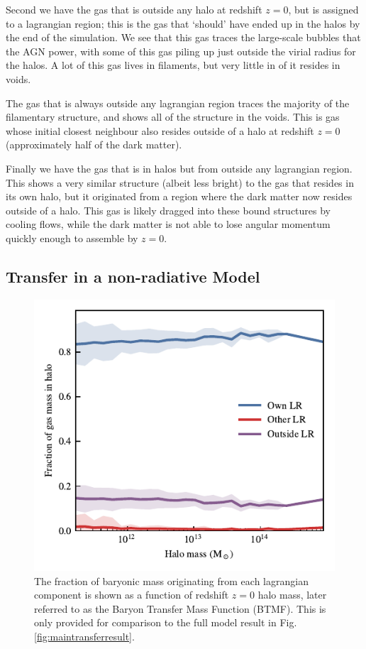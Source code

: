 Second we have the gas that is outside any halo at redshift $z=0$, but is assigned
to a lagrangian region; this is the gas that `should' have ended up in the halos by
the end of the simulation. We see that this gas traces the large-scale bubbles that
the AGN power, with some of this gas piling up just outside the virial radius for
the halos. A lot of this gas lives in filaments, but very little in of it resides
in voids.


The gas that is always outside any lagrangian region traces the majority of the
filamentary structure, and shows all of the structure in the voids. This is
gas whose initial closest neighbour also resides outside of a halo at redshift
$z=0$ (approximately half of the dark matter).

Finally we have the gas that is in halos but from outside any lagrangian
region. This shows a very similar structure (albeit less bright) to the gas
that resides in its own halo, but it originated from a region where the dark
matter now resides outside of a halo. This gas is likely dragged into these
bound structures by cooling flows, while the dark matter is not able to lose
angular momentum quickly enough to assemble by $z=0$.


\subsection{Transfer in a non-radiative Model}

\begin{figure}
	\centering
	\includegraphics[width=\columnwidth]{figures/s50gadget/component_fraction_vs_halo_mass_gas.pdf}
	\vspace{-0.7cm}
	\caption{
	The fraction of baryonic mass originating from each lagrangian component is
	shown as a function of redshift $z=0$ halo mass, later referred to as the
	Baryon Transfer Mass Function (BTMF). This is only provided for comparison to
	the full model result in Fig. \ref{fig:maintransferresult}.
	}
	\label{fig:nonradiativetransfer}
\end{figure}

